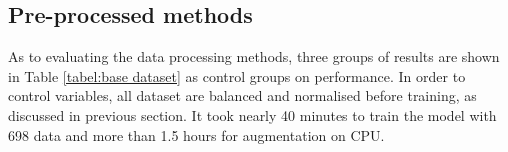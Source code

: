 \subsection*{Pre-processed methods}
As to evaluating the data processing methods, three groups of results are shown in Table \ref{tabel:base  dataset} as control groups on performance. In order to control variables, all dataset are balanced and normalised before training, as discussed in previous section. It took nearly 40 minutes to train the model with 698 data and more than 1.5 hours for augmentation on CPU.
\begin{table}[htp]
\centering
\caption{Metrics scores of baseline model with data processing methods}
\label{tabel:base dataset}
\end{table}
